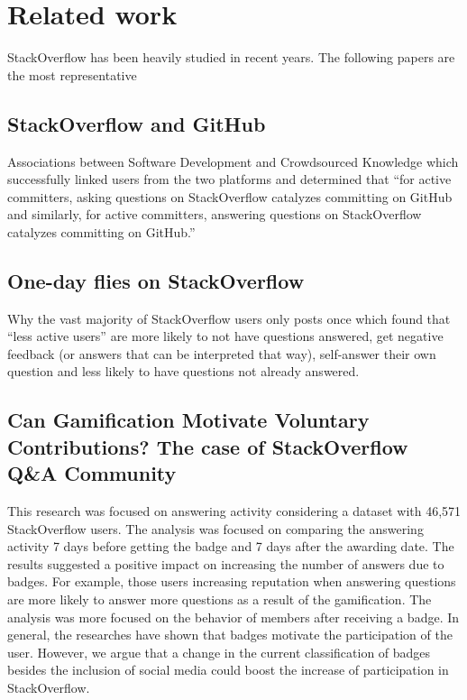 \documentclass{sigchi}
\begin{document}
\section{Related work}
StackOverflow has been heavily studied in recent years. The following papers
are the most representative

\subsection{StackOverflow and GitHub}

Associations between Software Development and Crowdsourced Knowledge which
successfully linked users from the two platforms and determined that “for
active committers, asking questions on StackOverflow catalyzes committing on
GitHub and similarly, for active committers, answering questions on
StackOverflow catalyzes committing on GitHub.”

\subsection{One-day flies on StackOverflow}

Why the vast majority of StackOverflow users only posts once which found that
“less active users” are more likely to not have questions answered, get
negative feedback (or answers that can be interpreted that way), self-answer
their own question and less likely to have questions not already answered.

\subsection{Can Gamification Motivate Voluntary Contributions? The case of
StackOverflow Q\&A Community}

This research was focused on answering activity considering a dataset with
46,571 StackOverflow users. The analysis was focused on comparing the answering
activity 7 days before getting the badge and 7 days after the awarding date.
The results suggested a positive impact on increasing the number of answers due
to badges. For example, those users increasing reputation when answering
questions are more likely to answer more questions as a result of the
gamification. The analysis was more focused on the behavior of members after
receiving a badge. In general, the researches have shown that badges motivate
the participation of the user. However, we argue that a change in the current
classification of badges besides the inclusion of social media could boost the
increase of participation in StackOverflow.
\end{document}
